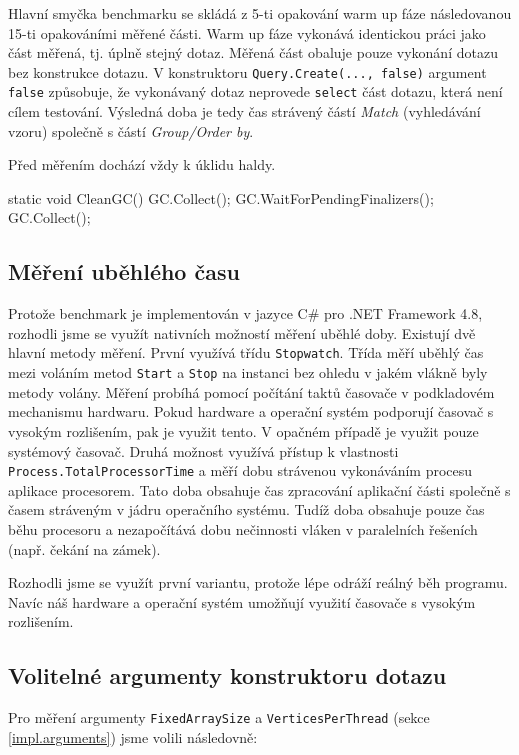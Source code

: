 Hlavní smyčka benchmarku se skládá z 5-ti opakování warm up fáze následovanou 15-ti opakováními měřené části.
Warm up fáze vykonává identickou práci jako část měřená, tj. úplně stejný dotaz. 
Měřená část obaluje pouze vykonání dotazu bez konstrukce dotazu. 
V konstruktoru \verb+Query.Create(..., false)+ argument \verb+false+ způsobuje, že vykonávaný dotaz neprovede \verb+select+ část dotazu, která není cílem testování.
Výsledná doba je tedy čas strávený částí \textit{Match} (vyhledávání vzoru) společně s částí \textit{Group/Order by}. 

Před měřením dochází vždy k úklidu haldy. 
\begin{code}
static void CleanGC()
{
    GC.Collect();
    GC.WaitForPendingFinalizers();
    GC.Collect();
}
\end{code}

\subsection{Měření uběhlého času}

Protože benchmark je implementován v jazyce C\# pro .NET Framework 4.8, rozhodli jsme se využít nativních možností měření uběhlé doby.
Existují dvě hlavní metody měření.
První využívá třídu \texttt{Stopwatch}.
Třída měří uběhlý čas mezi voláním metod \texttt{Start} a \texttt{Stop} na instanci bez ohledu v jakém vlákně byly metody volány.
Měření probíhá pomocí počítání taktů časovače v podkladovém mechanismu hardwaru.
Pokud hardware a operační systém podporují časovač s vysokým rozlišením, pak je využit tento.
V opačném případě je využit pouze systémový časovač. 
Druhá možnost využívá přístup k vlastnosti \texttt{Process.TotalProcessorTime} a měří dobu strávenou vykonáváním procesu aplikace procesorem.
Tato doba obsahuje čas zpracování aplikační části společně s časem stráveným v jádru operačního systému.
Tudíž doba obsahuje pouze čas běhu procesoru a nezapočítává dobu nečinnosti vláken v paralelních řešeních (např. čekání na zámek).

Rozhodli jsme se využít první variantu, protože lépe odráží reálný běh programu.
Navíc náš hardware a operační systém umožňují využití časovače s vysokým rozlišením.

\subsection{Volitelné argumenty konstruktoru dotazu}

Pro měření argumenty \verb+FixedArraySize+ a \verb+VerticesPerThread+ (sekce \ref{impl.arguments}) jsme volili následovně:


